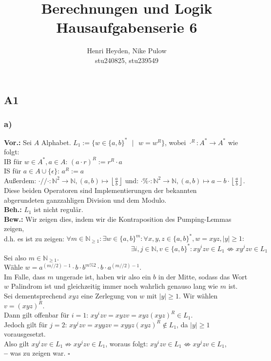 \documentclass[12pt, a4paper]{article}
\title{Berechnungen und Logik\\Hausaufgabenserie 6}
\author{Henri Heyden, Nike Pulow \\ \small stu240825, stu239549}
\date{}
\newcommand*{\qed}{\null\nobreak\hfill\ensuremath{\square}}
\newcommand*{\puffer}{\text{ }\text{ }\text{ }\text{ }}
\newcommand*{\gedanke}{\textbf{-- }}
\newcommand*{\gap}{\text{ }}
\newcommand*{\setDef}{\gap|\gap}
\newcommand*{\vor}{\textbf{Vor.:} \gap}
\newcommand*{\beh}{\textbf{Beh.:} \gap}
\newcommand*{\bew}{\textbf{Bew.:} \gap}
\begin{document}
\maketitle

\doublespacing
\vspace*{-2cm}
\subsection*{A1}
\subsubsection*{a)}
\vor Sei \(A\) Alphabet. \(L_1 := \{w \in \{a,b\}^* \setDef w = w^R\}\), wobei \(\cdot^R : A^* \rightarrow A^*\) wie folgt:\\
IB für \(w \in A^*, a \in A\): \((a \cdot r)^R := r^R \cdot a\)\\
IS für \(a \in A \cup \{\epsilon\}\): \(a^R := a\) \\
Außerdem: \(\cdot//\cdot: \mathbb{N}^2 \rightarrow \mathbb N, (a,b) \mapsto \left\lfloor \frac{a}{b} \right\rfloor\) und: \(\cdot\%\cdot : \mathbb{N}^2 \rightarrow \mathbb N, (a,b) \mapsto a - b \cdot \left\lfloor \frac{a}{b} \right\rfloor\).\\
Diese beiden Operatoren sind Implementierungen der bekannten \\ abgerundeten ganzzahligen Division und dem Modulo. \\
\beh \(L_1\) ist nicht regulär. \\
\bew Wir zeigen dies, indem wir die Kontraposition des Pumping-Lemmas zeigen,\\ d.h. es ist zu zeigen:
\(\forall m \in \mathbb N_{\ge 1}: \exists w \in \{a,b\}^m: \forall x,y,z \in \{a,b\}^*, w = xyz, |y| \ge 1:\)\\
\(\puffer\puffer\puffer\puffer\puffer\puffer\puffer\exists i,j \in \mathbb{N}, v \in \{a,b\}^*: xy^izv \in L_1 \not\Leftrightarrow xy^jzv \in L_1\)\\
Sei also \(m \in \mathbb N_{\ge 1}\).\\
Wähle \(w = a^{(m//2) - 1} \cdot b \cdot b^{m\% 2} \cdot b \cdot a^{(m//2) - 1}\).\\
Im Falle, dass \(m\) ungerade ist, haben wir also ein  \(b\) in der Mitte, sodass das Wort \(w\) Palindrom ist und gleichzeitig immer noch wahrlich genauso lang wie \(m\) ist. \\
Sei dementsprechend \(xyz\) eine Zerlegung von \(w\) mit \(|y| \ge 1\). Wir wählen \(v = (xyz)^R\). \\
Dann gilt offenbar für \(i = 1\): \(xy^izv = xyzv = xyz(xyz)^R \in L_1\). \\
Jedoch gilt für \(j = 2\): \(xy^jzv = xyyzv = xyyz(xyz)^R \not\in L_1\), da \(|y| \ge 1\) vorausgesetzt. \\
Also gilt \(xy^izv \in L_1 \not\Rightarrow xy^jzv \in L_1\), woraus folgt: \(xy^izv \in L_1 \not\Leftrightarrow xy^jzv \in L_1\),\\
\gedanke was zu zeigen war. \qed
\pagebreak
\end{document}
